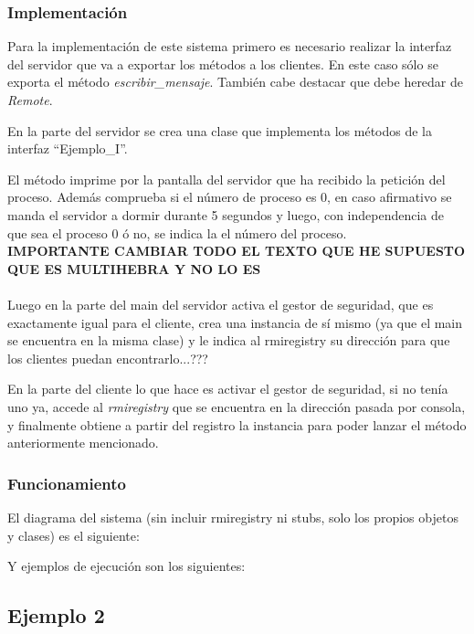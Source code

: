 \documentclass{article}
\begin{document}


\subsubsection{Implementación}
Para la implementación de este sistema primero es necesario realizar la interfaz del servidor que va a exportar los métodos a los clientes. En este caso sólo se exporta el método \textit{escribir\_mensaje}. También cabe destacar que debe heredar de \textit{Remote}.

En la parte del servidor se crea una clase que implementa los métodos de la interfaz ``Ejemplo\_I''.

El método imprime por la pantalla del servidor que ha recibido la petición del proceso. Además comprueba si el número de proceso es 0, en caso afirmativo se manda el servidor a dormir durante 5 segundos y luego, con independencia de que sea el proceso 0 ó no, se indica la el número del proceso.
\\

\textbf{IMPORTANTE CAMBIAR TODO EL TEXTO QUE HE SUPUESTO QUE ES MULTIHEBRA Y NO LO ES}
\\\\
Luego en la parte del main del servidor activa el gestor de seguridad, que es exactamente igual para el cliente, crea una instancia de sí mismo (ya que el main se encuentra en la misma clase) y le indica al rmiregistry su dirección para que los clientes puedan encontrarlo...???

En la parte del cliente lo que hace es activar el gestor de seguridad, si no tenía uno ya, accede al \textit{rmiregistry} que se encuentra en la dirección pasada por consola, y finalmente obtiene a partir del registro la instancia para poder lanzar el método anteriormente mencionado.


\subsubsection{Funcionamiento}
El diagrama del sistema (sin incluir rmiregistry ni stubs, solo los propios objetos y clases) es el siguiente:

Y ejemplos de ejecución son los siguientes:



\subsection{Ejemplo 2}
\end{document}
